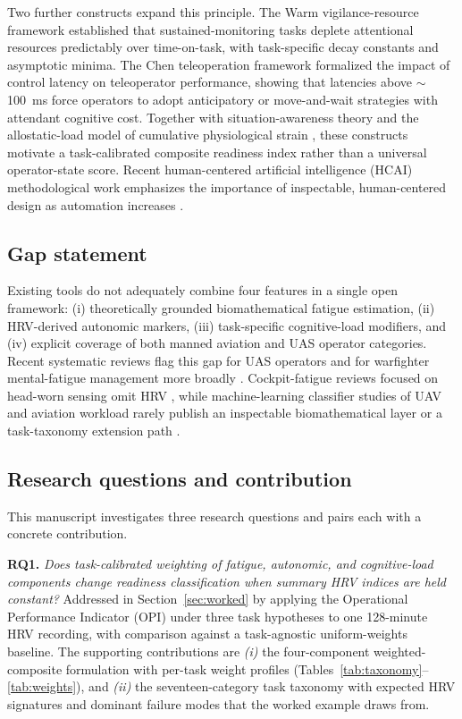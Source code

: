\documentclass[10pt,journal,twocolumn,compsoc]{IEEEtran}
\begin{document}
Two further constructs expand this principle. The Warm vigilance-resource framework \cite{warm2008} established that sustained-monitoring tasks deplete attentional resources predictably over time-on-task, with task-specific decay constants and asymptotic minima. The Chen teleoperation framework \cite{chen2007} formalized the impact of control latency on teleoperator performance, showing that latencies above $\sim$100~ms force operators to adopt anticipatory or move-and-wait strategies with attendant cognitive cost. Together with situation-awareness theory \cite{endsley1995} and the allostatic-load model of cumulative physiological strain \cite{mcewen1998}, these constructs motivate a task-calibrated composite readiness index rather than a universal operator-state score. Recent human-centered artificial intelligence (HCAI) methodological work emphasizes the importance of inspectable, human-centered design as automation increases \cite{xu2026}.

\subsection{Gap statement}
Existing tools do not adequately combine four features in a single open framework: (i) theoretically grounded biomathematical fatigue estimation, (ii) HRV-derived autonomic markers, (iii) task-specific cognitive-load modifiers, and (iv) explicit coverage of both manned aviation and UAS operator categories. Recent systematic reviews flag this gap for UAS operators \cite{li2025} and for warfighter mental-fatigue management more broadly \cite{rabat2025}. Cockpit-fatigue reviews focused on head-worn sensing omit HRV \cite{hamann2026}, while machine-learning classifier studies of UAV and aviation workload rarely publish an inspectable biomathematical layer or a task-taxonomy extension path \cite{stevens2022,vogl2025}.

\subsection{Research questions and contribution}
This manuscript investigates three research questions and pairs each with a concrete contribution.

\textbf{RQ1.} \emph{Does task-calibrated weighting of fatigue, autonomic, and cognitive-load components change readiness classification when summary HRV indices are held constant?} Addressed in Section~\ref{sec:worked} by applying the Operational Performance Indicator (OPI) under three task hypotheses to one 128-minute HRV recording, with comparison against a task-agnostic uniform-weights baseline. The supporting contributions are \textit{(i)} the four-component weighted-composite formulation with per-task weight profiles (Tables~\ref{tab:taxonomy}--\ref{tab:weights}), and \textit{(ii)} the seventeen-category task taxonomy with expected HRV signatures and dominant failure modes that the worked example draws from.
\end{document}
